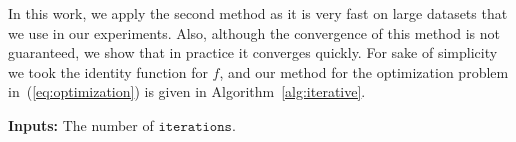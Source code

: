 In this work, we apply the second method as it is very fast on large datasets that we use in our experiments. Also, although the convergence of this method is not guaranteed, we show that in practice it converges quickly. For sake of simplicity we took the identity function for $f$, and our method for the optimization problem in~(\ref{eq:optimization}) is given in Algorithm~\ref{alg:iterative}.







\begin{algorithm}[!h]
\BlankLine
{\bf Inputs:} The number of  $\texttt{iterations}$.

\caption{$\optimizer(\texttt{iterations})$}\label{alg:iterative}
\end{algorithm}  



